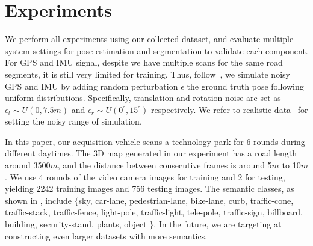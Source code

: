 \vspace{-0.8\baselineskip}
\section{Experiments}
\vspace{-0.4\baselineskip}
\label{sec:experiments}
We perform all experiments using our collected dataset, and evaluate multiple system settings for pose estimation and segmentation to validate each component.
For GPS and IMU signal, despite we have multiple scans for the same road segments, it is still very limited for training. Thus, follow~\cite{vishal2015accurate}, we simulate noisy GPS and IMU by adding random perturbation $\epsilon$ \wrt the ground truth pose following uniform distributions. 
Specifically, translation and rotation noise are set as $\epsilon_t \sim U(0, 7.5m)$ and $\epsilon_r \sim U(0^{\circ}, 15^{\circ})$ respectively. 
We refer to realistic data~\cite{lee2015gps} for setting the noisy range of simulation.

In this paper, our acquisition vehicle scans a technology park for 6 rounds during different daytimes. The 3D map generated in our experiment has a road length around 3500$m$, and the distance between consecutive frames is around 5$m$ to 10$m$. We use 4 rounds of the video camera images for training and 2 for testing, yielding 2242 training images and 756 testing images. The semantic classes, as shown in , include $\{$sky, car-lane, pedestrian-lane, bike-lane, curb, traffic-cone, traffic-stack, traffic-fence, light-pole, traffic-light, tele-pole, traffic-sign, billboard, building, security-stand, plants, object $\}$. In the future, we are targeting at constructing even larger datasets with more semantics.

